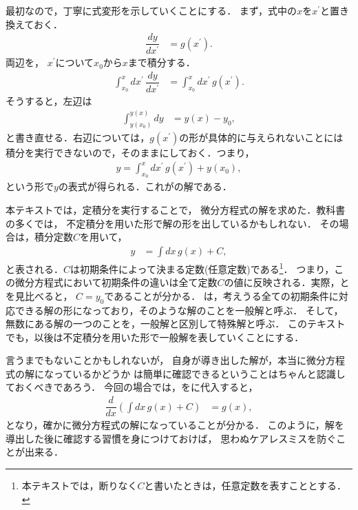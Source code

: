最初なので，丁寧に式変形を示していくことにする．
まず，式中の$x$を$x^\prime$と置き換えておく．
%
\begin{align}
 \dfrac{dy}{dx^{\prime}} & =g\left(x^{\prime}\right).
\end{align}
%
両辺を，
$x^{\prime}$について$x_0$から$x$まで積分する．
\begin{align}
 \int_{x_{0}}^{x}dx^{\prime}\,\dfrac{dy}{dx^{\prime}} & =\int_{x_{0}}^{x}dx^{\prime}\,g\left(x^{\prime}\right). \label{eq:PDE_01_teiseki}
\end{align}
そうすると，左辺は
\begin{align}
 \int_{y\left(x_{0}\right)}^{y\left(x\right)}dy & =y\left(x\right)-y_{0},
\end{align}
と書き直せる．右辺については，$g(x^\prime)$の形が具体的に与えられないことには
積分を実行できないので，そのままにしておく．つまり，
\begin{align}
 y = \int_{x_0}^{x} dx^\prime \, g(x^\prime) + y\left(x_0\right), \label{eq:PDE_01_sol_01}
\end{align}
という形で$y$の表式が得られる．これがの解である．

本テキストでは，定積分を実行することで，
微分方程式の解を求めた．教科書の多くでは，
不定積分を用いた形で解の形を出しているかもしれない．
その場合は，積分定数$C$を用いて，
\begin{align}
y & =\int dx\, g\left(x\right)+C, \label{eq:PDE_01_sol_02}
\end{align}
と表される．$C$は初期条件によって決まる定数(任意定数)である\footnote{本テキストでは，断りなく$C$と書いたときは，任意定数を表すこととする．}．
つまり，この微分方程式において初期条件の違いは全て定数$C$の値に反映される．実際，とを見比べると，
$C=y_0$であることが分かる．
は，考えうる全ての初期条件に対応できる解の形になっており，そのような解のことを一般解と呼ぶ．
そして，無数にある解の一つのことを，一般解と区別して特殊解と呼ぶ．
このテキストでも，以後は不定積分を用いた形で一般解を表していくことにする．

言うまでもないことかもしれないが，
自身が導き出した解が，本当に微分方程式の解になっているかどうか
は簡単に確認できるということはちゃんと認識しておくべきであろう．
今回の場合では，をに代入すると，
\begin{align}
  \dfrac{d}{dx}\left(\int dx\,g\left(x\right)+C\right) & =g\left(x\right),
\end{align}
となり，確かに微分方程式の解になっていることが分かる．
このように，解を導出した後に確認する習慣を身につけておけば，
思わぬケアレスミスを防ぐことが出来る．
%
